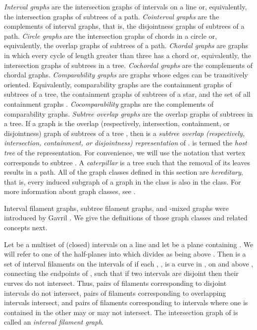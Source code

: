\documentclass[
final
]{dmtcs-episciences}        \usepackage{graphics, amsthm, amsmath, amssymb, algorithm, algorithmic}
\begin{document}
{\em Interval graphs} are the intersection graphs of intervals
on a line or, equivalently, the intersection graphs of subtrees of a path.
{\em Cointerval graphs} are the complements of interval graphs, that is, the disjointness graphs of subtrees of a path.
{\em Circle graphs} are the 
intersection graphs of chords in a circle or, equivalently, the overlap graphs of subtrees of a path.  {\em Chordal graphs} are graphs in which
every cycle of length greater than three has a chord
or, equivalently, the intersection graphs of subtrees in
a tree. 
{\em Cochordal graphs} are the complements of chordal graphs.
{\em Comparability graphs} are graphs whose edges
can be transitively oriented. Equivalently, comparability
graphs are the containment graphs of subtrees of a
tree, the containment graphs of subtrees of a star, and
the set of all containment graphs \cite{GolSch}. 
{\em Cocomparability} graphs are the complements of comparability graphs.
{\em Subtree overlap graphs} are the overlap graphs of subtrees in a tree.
If a graph  is the overlap (respectively, intersection, containment, or disjointness) graph of 
subtrees  of a tree , then  is a \emph{subtree overlap (respectively, intersection, containment, or disjointness) representation} of .  is termed the {\em host tree} of the representation. For convenience, we will use the notation that vertex  corresponds to subtree . 
A {\em caterpillar} is a tree such that the removal of its leaves results in a path.
All of the graph classes defined in this section are {\em hereditary}, that is, every induced subgraph of a graph in the class is also in the class.
For more information about graph classes, see \cite{BLS}.

Interval filament graphs, subtree filament graphs, and -mixed graphs were introduced by Gavril \cite{gavril2000}. We give the definitions of those graph classes and related concepts next.

Let  be a multiset of (closed) intervals on a line  and let  be a plane containing . We will refer to one of the half-planes into which  divides  as being above .
Then  is a set of interval filaments on the intervals of  if
each , , is a curve in , on and above , connecting the endpoints of , such that if two intervals are disjoint then their curves do not intersect.
Thus, pairs of filaments corresponding to disjoint intervals do not intersect, pairs of filaments corresponding to overlapping intervals intersect, and pairs of filaments corresponding to intervals where one is contained in the other may or may not intersect.
The intersection graph of  is called an {\em interval filament graph}.
\end{document}
